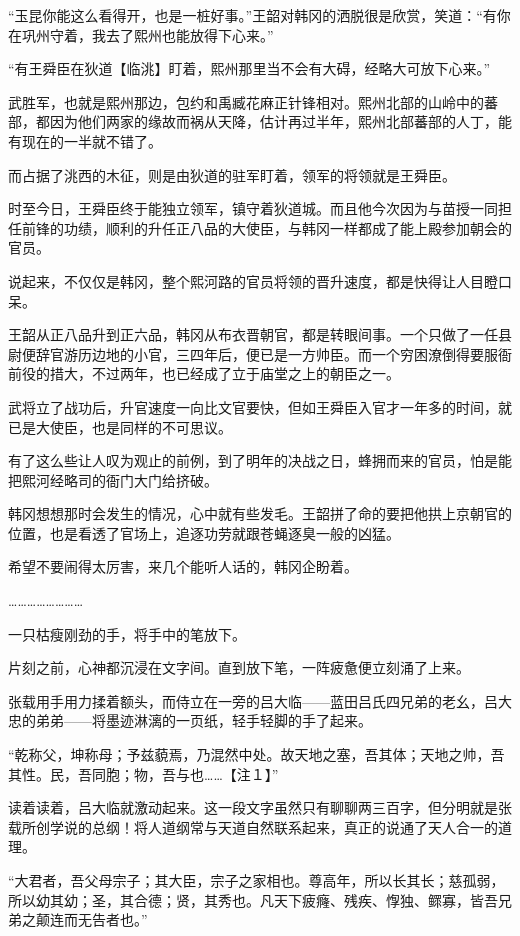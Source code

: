 “玉昆你能这么看得开，也是一桩好事。”王韶对韩冈的洒脱很是欣赏，笑道：“有你在巩州守着，我去了熙州也能放得下心来。”

“有王舜臣在狄道【临洮】盯着，熙州那里当不会有大碍，经略大可放下心来。”

武胜军，也就是熙州那边，包约和禹臧花麻正针锋相对。熙州北部的山岭中的蕃部，都因为他们两家的缘故而祸从天降，估计再过半年，熙州北部蕃部的人丁，能有现在的一半就不错了。

而占据了洮西的木征，则是由狄道的驻军盯着，领军的将领就是王舜臣。

时至今日，王舜臣终于能独立领军，镇守着狄道城。而且他今次因为与苗授一同担任前锋的功绩，顺利的升任正八品的大使臣，与韩冈一样都成了能上殿参加朝会的官员。

说起来，不仅仅是韩冈，整个熙河路的官员将领的晋升速度，都是快得让人目瞪口呆。

王韶从正八品升到正六品，韩冈从布衣晋朝官，都是转眼间事。一个只做了一任县尉便辞官游历边地的小官，三四年后，便已是一方帅臣。而一个穷困潦倒得要服衙前役的措大，不过两年，也已经成了立于庙堂之上的朝臣之一。

武将立了战功后，升官速度一向比文官要快，但如王舜臣入官才一年多的时间，就已是大使臣，也是同样的不可思议。

有了这么些让人叹为观止的前例，到了明年的决战之日，蜂拥而来的官员，怕是能把熙河经略司的衙门大门给挤破。

韩冈想想那时会发生的情况，心中就有些发毛。王韶拼了命的要把他拱上京朝官的位置，也是看透了官场上，追逐功劳就跟苍蝇逐臭一般的凶猛。

希望不要闹得太厉害，来几个能听人话的，韩冈企盼着。

……………………

一只枯瘦刚劲的手，将手中的笔放下。

片刻之前，心神都沉浸在文字间。直到放下笔，一阵疲惫便立刻涌了上来。

张载用手用力揉着额头，而侍立在一旁的吕大临——蓝田吕氏四兄弟的老幺，吕大忠的弟弟——将墨迹淋漓的一页纸，轻手轻脚的手了起来。

“乾称父，坤称母；予兹藐焉，乃混然中处。故天地之塞，吾其体；天地之帅，吾其性。民，吾同胞；物，吾与也……【注１】”

读着读着，吕大临就激动起来。这一段文字虽然只有聊聊两三百字，但分明就是张载所创学说的总纲！将人道纲常与天道自然联系起来，真正的说通了天人合一的道理。

“大君者，吾父母宗子；其大臣，宗子之家相也。尊高年，所以长其长；慈孤弱，所以幼其幼；圣，其合德；贤，其秀也。凡天下疲癃、残疾、惸独、鳏寡，皆吾兄弟之颠连而无告者也。”

